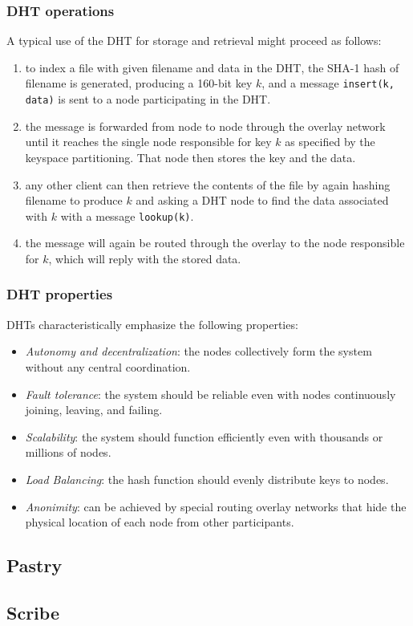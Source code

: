 \documentclass[a4paper,12pt]{article}
\begin{document}
\subsubsection{DHT operations}

A typical use of the DHT for storage and retrieval might proceed as follows:
\begin{enumerate}[label=\arabic*.]
  \item to index a file with given filename and data in the DHT, the SHA-1 hash of filename is generated, producing a 160-bit key $k$, and a message \texttt{insert(k, data)} is sent to a node participating in the DHT.
  \item the message is forwarded from node to node through the overlay network until it reaches the single node responsible for key $k$ as specified by the keyspace partitioning. That node then stores the key and the data.
  \item any other client can then retrieve the contents of the file by again hashing filename to produce $k$ and asking a DHT node to find the data associated with $k$ with a message \texttt{lookup(k)}.
  \item the message will again be routed through the overlay to the node responsible for $k$, which will reply with the stored data.
\end{enumerate}

\subsubsection{DHT properties}

DHTs characteristically emphasize the following properties:
\begin{itemize}
  \item \textit{Autonomy and decentralization}: the nodes collectively form the system without any central coordination.
  \item \textit{Fault tolerance}: the system should be reliable even with nodes continuously joining, leaving, and failing.
  \item \textit{Scalability}: the system should function efficiently even with thousands or millions of nodes.
  \item \textit{Load Balancing}: the hash function should evenly distribute keys to nodes.
  \item \textit{Anonimity}: can be achieved by special routing overlay networks that hide the physical location of each node from other participants.
\end{itemize}

\subsection{Pastry}

\subsection{Scribe}
\end{document}
